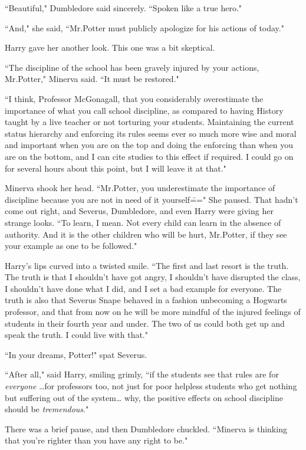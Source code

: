 ``Beautiful," Dumbledore said sincerely. ``Spoken like a true hero."

``And," she said, ``Mr.\?Potter must publicly apologize for his actions of today."

Harry gave her another look. This one was a bit skeptical.

``The discipline of the school has been gravely injured by your actions, Mr.\?Potter," Minerva said. ``It must be restored."

``I think, Professor McGonagall, that you considerably overestimate the importance of what you call school discipline, as compared to having History taught by a live teacher or not torturing your students. Maintaining the current status hierarchy and enforcing its rules seems ever so much more wise and moral and important when you are on the top and doing the enforcing than when you are on the bottom, and I can cite studies to this effect if required. I could go on for several hours about this point, but I will leave it at that."

Minerva shook her head. ``Mr.\?Potter, you underestimate the importance of discipline because you are not in need of it yourself\===" She paused. That hadn't come out right, and Severus, Dumbledore, and even Harry were giving her strange looks. ``To learn, I mean. Not every child can learn in the absence of authority. And it is the other children who will be hurt, Mr.\?Potter, if they see your example as one to be followed."

Harry's lips curved into a twisted smile. ``The first and last resort is the truth. The truth is that I shouldn't have got angry, I shouldn't have disrupted the class, I shouldn't have done what I did, and I set a bad example for everyone. The truth is also that Severus Snape behaved in a fashion unbecoming a Hogwarts professor, and that from now on he will be more mindful of the injured feelings of students in their fourth year and under. The two of us could both get up and speak the truth. I could live with that."

``In your dreams, Potter!" spat Severus.

``After all," said Harry, smiling grimly, ``if the students see that rules are for \emph{everyone} {\ldots}for professors too, not just for poor helpless students who get nothing but suffering out of the system{\ldots} why, the positive effects on school discipline should be \emph{tremendous}."

There was a brief pause, and then Dumbledore chuckled. ``Minerva is thinking that you're righter than you have any right to be."

